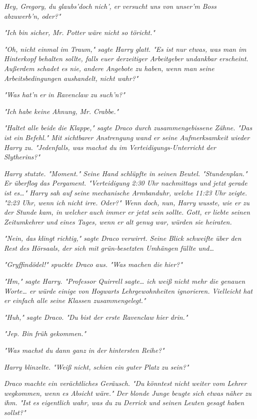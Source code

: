 {\emph{Hey, Gregory, du glaubs'doch nich', er versucht uns von unser'm Boss abzuwerb'n, oder?"}

\emph{"Ich bin sicher, Mr. Potter wäre nicht so töricht."}

\emph{"Oh, nicht einmal im Traum," sagte Harry glatt. "Es ist nur etwas, was man im Hinterkopf behalten sollte, falls euer derzeitiger Arbeitgeber undankbar erscheint. Außerdem schadet es nie, andere Angebote zu haben, wenn man seine Arbeitsbedingungen aushandelt, nicht wahr?"}

\emph{"Was hat'n} \emph{\emph{er}} \emph{in Ravenclaw zu such'n?"}

\emph{"Ich habe keine Ahnung, Mr. Crabbe."}

\emph{"Haltet alle beide} \emph{\emph{die Klappe,}" sagte Draco durch zusammengebissene Zähne. "Das ist ein} \emph{\emph{Befehl.}" Mit sichtbarer Anstrengung wand er seine Aufmerksamkeit wieder Harry zu. "Jedenfalls, was machst du im Verteidigungs-Unterricht der Slytherins?"}

\emph{Harry stutzte. "Moment." Seine Hand schlüpfte in seinen Beutel. "Stundenplan." Er überflog das Pergament. "Verteidigung 2:30 Uhr nachmittags und jetzt gerade ist es…" Harry sah auf seine mechanische Armbanduhr, welche 11:23 Uhr zeigte. "2:23 Uhr, wenn ich nicht irre. Oder?" Wenn doch, nun, Harry wusste, wie er zu der Stunde kam, in welcher auch immer er jetzt sein} \emph{\emph{sollte}. Gott, er liebte seinen Zeitumkehrer und eines Tages, wenn er alt genug war, würden sie heiraten.}

\emph{"Nein, das klingt richtig," sagte Draco verwirrt. Seine Blick schweifte über den Rest des Hörsaals, der sich mit grün-besetzten Umhängen füllte und…}

\emph{"\emph{Gryffindödel!}" spuckte Draco aus. "Was machen} \emph{\emph{die}} \emph{hier?"}

\emph{"Hm," sagte Harry. "Professor Quirrell sagte… ich weiß nicht mehr die genauen Worte… er würde einige von Hogwarts Lehrgewohnheiten ignorieren. Vielleicht hat er einfach alle seine Klassen zusammengelegt."}

\emph{"Huh," sagte Draco. "Du bist der erste Ravenclaw hier drin."}

\emph{"Jep. Bin früh gekommen."}

\emph{"Was machst du dann ganz in der hintersten Reihe?"}

\emph{Harry blinzelte. "Weiß nicht, schien ein guter Platz zu sein?"}

\emph{Draco machte ein verächtliches Geräusch. "Du könntest nicht weiter vom Lehrer wegkommen, wenn es Absicht wäre." Der blonde Junge beugte sich etwas näher zu ihm. "Ist es eigentlich wahr, was du zu Derrick und seinen Leuten gesagt haben sollst?"}

}
